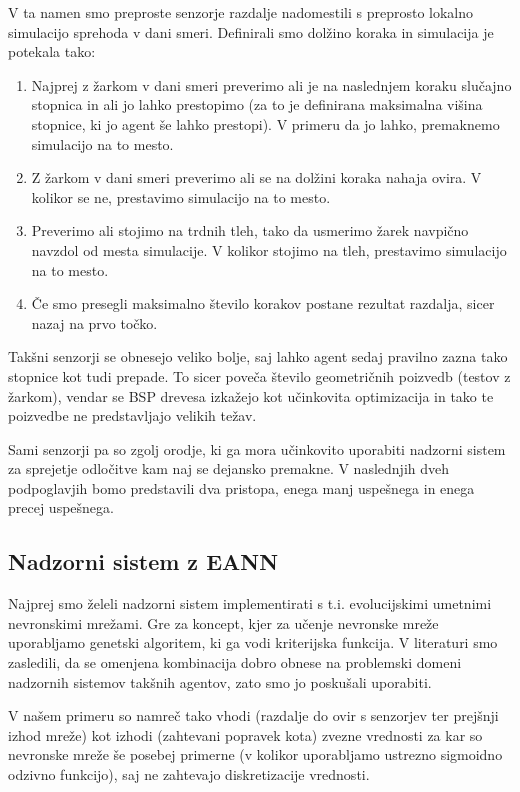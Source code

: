 \documentclass[a4paper,10pt]{article}
\begin{document}
V ta namen smo preproste senzorje razdalje nadomestili s preprosto lokalno simulacijo sprehoda v dani smeri. Definirali smo dolžino koraka in simulacija je potekala tako:
\begin{enumerate}
  \item Najprej z žarkom v dani smeri preverimo ali je na naslednjem koraku slučajno stopnica in ali jo lahko prestopimo (za to je definirana maksimalna višina stopnice, ki jo agent še lahko prestopi). V primeru da jo lahko, premaknemo simulacijo na to mesto.
  
  \item Z žarkom v dani smeri preverimo ali se na dolžini koraka nahaja ovira. V kolikor se ne, prestavimo simulacijo na to mesto.
  
  \item Preverimo ali stojimo na trdnih tleh, tako da usmerimo žarek navpično navzdol od mesta simulacije. V kolikor stojimo na tleh, prestavimo simulacijo na to mesto.
  
  \item Če smo presegli maksimalno število korakov postane rezultat razdalja, sicer nazaj na prvo točko.
\end{enumerate}

Takšni senzorji se obnesejo veliko bolje, saj lahko agent sedaj pravilno zazna tako stopnice kot tudi prepade. To sicer poveča število geometričnih poizvedb (testov z žarkom), vendar se BSP drevesa izkažejo kot učinkovita optimizacija in tako te poizvedbe ne predstavljajo velikih težav.

Sami senzorji pa so zgolj orodje, ki ga mora učinkovito uporabiti nadzorni sistem za sprejetje odločitve kam naj se dejansko premakne. V naslednjih dveh podpoglavjih bomo predstavili dva pristopa, enega manj uspešnega in enega precej uspešnega.

\subsection{Nadzorni sistem z EANN} \label{sec:EANN}

Najprej smo želeli nadzorni sistem implementirati s t.i. evolucijskimi umetnimi nevronskimi mrežami. Gre za koncept, kjer za učenje nevronske mreže uporabljamo genetski algoritem, ki ga vodi kriterijska funkcija. V literaturi \cite{champandard02} smo zasledili, da se omenjena kombinacija dobro obnese na problemski domeni nadzornih sistemov takšnih agentov, zato smo jo poskušali uporabiti.

V našem primeru so namreč tako vhodi (razdalje do ovir s senzorjev ter prejšnji izhod mreže) kot izhodi (zahtevani popravek kota) zvezne vrednosti za kar so nevronske mreže še posebej primerne (v kolikor uporabljamo ustrezno sigmoidno odzivno funkcijo), saj ne zahtevajo diskretizacije vrednosti.
\end{document}
